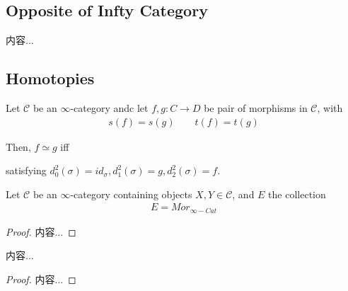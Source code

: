 \documentclass[Total.tex]{subfiles}
\begin{document}
			
			\subsection{Opposite of Infty Category}
				\begin{Def}
					内容...
				\end{Def}
			\subsection{Homotopies}
				\begin{Def}
					Let $\mathcal{C}$ be an $\infty$-category andc let $f,g:C\rightarrow D$ be pair of morphisms in $\mathcal{C}$, with 
					\begin{gather*}
						s(f)=s(g)\qquad t(f)=t(g)
					\end{gather*}
					
					Then, $f\simeq g$ iff \begin{center}
					\end{center}
					
					satisfying $d^2_0(\sigma)=id_\sigma,d_1^2(\sigma)=g,d_2^2(\sigma)=f$.
				\end{Def}
				
				\begin{proposition}
					Let $\mathcal{C}$ be an $\infty$-category containing objects $X,Y\in \mathcal{C}$, and $E$ the collection
					\begin{gather*}
						E=Mor_{\infty-Cat}
					\end{gather*}
				\end{proposition}
				\begin{proof}
					内容...
				\end{proof}
				
				\begin{proposition}
					内容...
				\end{proposition}
				\begin{proof}
					内容...
				\end{proof}
\end{document}
